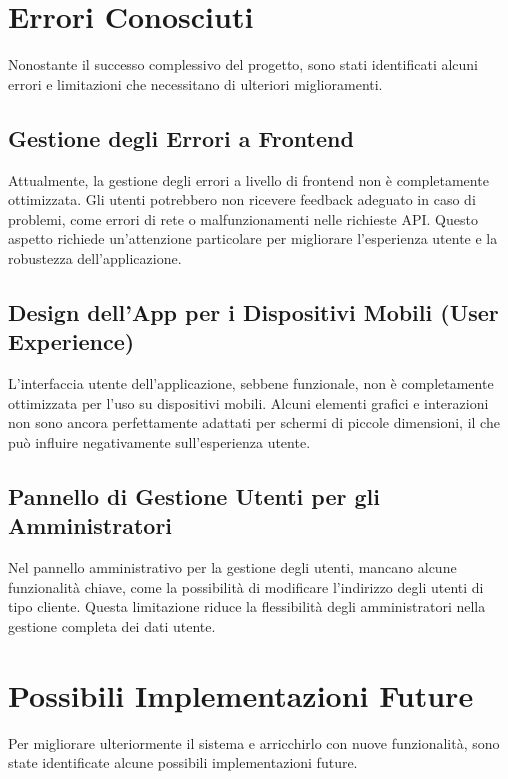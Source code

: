 \documentclass[twoside]{supsistudent}
\begin{document}
\section{Errori Conosciuti}

Nonostante il successo complessivo del progetto, sono stati identificati alcuni errori e limitazioni che necessitano di ulteriori miglioramenti.

\subsection{Gestione degli Errori a Frontend}

Attualmente, la gestione degli errori a livello di frontend non è completamente ottimizzata. Gli utenti potrebbero non ricevere feedback adeguato in caso di problemi, come errori di rete o malfunzionamenti nelle richieste API. Questo aspetto richiede un'attenzione particolare per migliorare l'esperienza utente e la robustezza dell'applicazione.

\subsection{Design dell'App per i Dispositivi Mobili (User Experience)}

L'interfaccia utente dell'applicazione, sebbene funzionale, non è completamente ottimizzata per l'uso su dispositivi mobili. Alcuni elementi grafici e interazioni non sono ancora perfettamente adattati per schermi di piccole dimensioni, il che può influire negativamente sull'esperienza utente.

\subsection{Pannello di Gestione Utenti per gli Amministratori}

Nel pannello amministrativo per la gestione degli utenti, mancano alcune funzionalità chiave, come la possibilità di modificare l'indirizzo degli utenti di tipo cliente. Questa limitazione riduce la flessibilità degli amministratori nella gestione completa dei dati utente.

\section{Possibili Implementazioni Future}

Per migliorare ulteriormente il sistema e arricchirlo con nuove funzionalità, sono state identificate alcune possibili implementazioni future.
\end{document}

